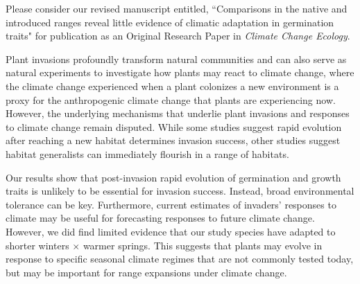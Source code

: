 \documentclass[11pt]{article}
\begin{document}
	\medskip
	Please consider our revised manuscript entitled, ``Comparisons in the native and introduced ranges reveal little evidence of climatic adaptation in germination traits" for publication as an Original Research Paper in \textit{Climate Change Ecology}. \par
	Plant invasions profoundly transform natural communities and can also serve as natural experiments to investigate how plants may react to climate change, where the climate change experienced when a plant colonizes a new environment is a proxy for the anthropogenic climate change that plants are experiencing now. However, the underlying mechanisms that underlie plant invasions and responses to climate change remain disputed. While some studies suggest rapid evolution after reaching a new habitat determines invasion success, other studies suggest habitat generalists can immediately flourish in a range of habitats.\par 
	Our results show that post-invasion rapid evolution of germination and growth traits is unlikely to be essential for invasion success. Instead, broad environmental tolerance can be key. Furthermore, current estimates of invaders' responses to climate may be useful for forecasting responses to future climate change. However, we did find limited evidence that our study species have adapted to shorter winters $\times$ warmer springs. This suggests that plants may evolve in response to specific seasonal climate regimes that are not commonly tested today, but may be important for range expansions under climate change. \par 
\end{document}
